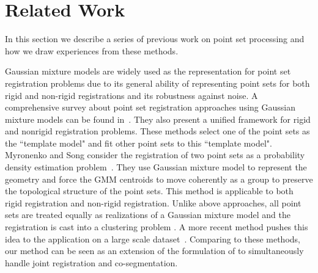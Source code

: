 \section{Related Work}
\label{sec:rw}
In this section we describe a series of previous work on point set processing and how we draw experiences from these methods. 

Gaussian mixture models are widely used as the representation for point set registration problems due to its general ability of representing point sets for both rigid and non-rigid registrations and its robustness against noise.
%
A comprehensive survey about point set registration approaches using Gaussian mixture models can be found in~\cite{GMM_PAMI}. 
They also present a unified framework for rigid and nonrigid registration problems. 
%
These methods select one of the point sets as the ``template model" and fit other point sets to this ``template model".
%
Myronenko and Song consider the registration of two point sets as a probability density estimation problem~\cite{CPD}.
They use Gaussian mixture model to represent the geometry and force the GMM centroids to move coherently as a group to preserve the topological structure of the point sets. 
This method is applicable to both rigid registration and non-rigid registration. 
%
%
Unlike above approaches, all point sets are treated equally as realizations of a Gaussian mixture model and the registration is cast into a clustering problem \cite{Evangelidis2014} . 
A more recent method pushes this idea to the application on a large scale dataset~\cite{GOGMA}. 
Comparing to these methods, our method can be seen as an extension of the formulation of \cite{Evangelidis2014} to simultaneously handle joint registration and co-segmentation. 

